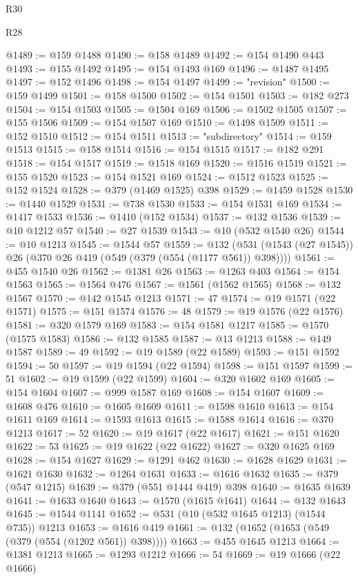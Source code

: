 \begin{lexlean}{R30}
\begin{lexlean}{R28}
\begin{coremodule}
{{{{{{{{{{{{{{{{{{{{{{{{{{{{{{{{{{{{{{{{{{{{{{{{{{{{{{{{{{{{{{{{{{{{{{{{{{{{{{{{{{{{{{{{{{{{{{{{{{{{{{{{{{{{{{{{{{{{{{{{{{{{{{{{{{{{{{{{{{{{{{{@1489 := @159 @1488
@1490 := @158 @1489
@1492 := @154 @1490 @443
@1493 := @155 @1492
@1495 := @154 @1493 @169
@1496 := @1487 @1495
@1497 := @152 @1496
@1498 := @154 @1497
@1499 := "revision"
@1500 := @159 @1499
@1501 := @158 @1500
@1502 := @154 @1501
@1503 := @182 @273
@1504 := @154 @1503
@1505 := @1504 @169
@1506 := @1502 @1505
@1507 := @155 @1506
@1509 := @154 @1507 @169
@1510 := @1498 @1509
@1511 := @152 @1510
@1512 := @154 @1511
@1513 := "subdirectory"
@1514 := @159 @1513
@1515 := @158 @1514
@1516 := @154 @1515
@1517 := @182 @291
@1518 := @154 @1517
@1519 := @1518 @169
@1520 := @1516 @1519
@1521 := @155 @1520
@1523 := @154 @1521 @169
@1524 := @1512 @1523
@1525 := @152 @1524
@1528 := @379 (@1469 @1525) @398
@1529 := @1459 @1528
@1530 := @1440 @1529
@1531 := @738 @1530
@1533 := @154 @1531 @169
@1534 := @1417 @1533
@1536 := @1410 (@152 @1534)
@1537 := @132 @1536
@1539 := @10 @1212 @57
@1540 := @27 @1539
@1543 := @10 (@532 @1540 @26)
@1544 := @10 @1213
@1545 := @1544 @57
@1559 := @132 (@531 (@1543 (@27 @1545)) @26 (@370 @26 @419 (@549 (@379 (@554 (@1177 @561)) @398))))
@1561 := @455 @1540 @26
@1562 := @1381 @26
@1563 := @1263 @403
@1564 := @154 @1563
@1565 := @1564 @476
@1567 := @1561 (@1562 @1565)
@1568 := @132 @1567
@1570 := @142 @1545 @1213
@1571 := 47
@1574 := @19 @1571 (@22 @1571)
@1575 := @151 @1574
@1576 := 48
@1579 := @19 @1576 (@22 @1576)
@1581 := @320 @1579 @169
@1583 := @154 @1581 @1217
@1585 := @1570 (@1575 @1583)
@1586 := @132 @1585
@1587 := @13 @1213
@1588 := @149 @1587
@1589 := 49
@1592 := @19 @1589 (@22 @1589)
@1593 := @151 @1592
@1594 := 50
@1597 := @19 @1594 (@22 @1594)
@1598 := @151 @1597
@1599 := 51
@1602 := @19 @1599 (@22 @1599)
@1604 := @320 @1602 @169
@1605 := @154 @1604
@1607 := @999 @1587 @169
@1608 := @154 @1607
@1609 := @1608 @476
@1610 := @1605 @1609
@1611 := @1598 @1610
@1613 := @154 @1611 @169
@1614 := @1593 @1613
@1615 := @1588 @1614
@1616 := @370 @1213
@1617 := 52
@1620 := @19 @1617 (@22 @1617)
@1621 := @151 @1620
@1622 := 53
@1625 := @19 @1622 (@22 @1622)
@1627 := @320 @1625 @169
@1628 := @154 @1627
@1629 := @1291 @462
@1630 := @1628 @1629
@1631 := @1621 @1630
@1632 := @1264 @1631
@1633 := @1616 @1632
@1635 := @379 (@547 @1215)
@1639 := @379 (@551 @1444 @419) @398
@1640 := @1635 @1639
@1641 := @1633 @1640
@1643 := @1570 (@1615 @1641)
@1644 := @132 @1643
@1645 := @1544 @1141
@1652 := @531 (@10 (@532 @1645 @1213) (@1544 @735)) @1213
@1653 := @1616 @419
@1661 := @132 (@1652 (@1653 (@549 (@379 (@554 (@1202 @561)) @398))))
@1663 := @455 @1645 @1213
@1664 := @1381 @1213
@1665 := @1293 @1212
@1666 := 54
@1669 := @19 @1666 (@22 @1666)
}}}}}}}}}}}}}}}}}}}}}}}}}}}}}}}}}}}}}}}}}}}}}}}}}}}}}}}}}}}}}}}}}}}}}}}}}}}}}}}}}}}}}}}}}}}}}}}}}}}}}}}}}}}}}}}}}}}}}}}}}}}}}}}}}}}}}}}}}}}}}}}
\end{coremodule}
\end{lexlean}
\end{lexlean}
